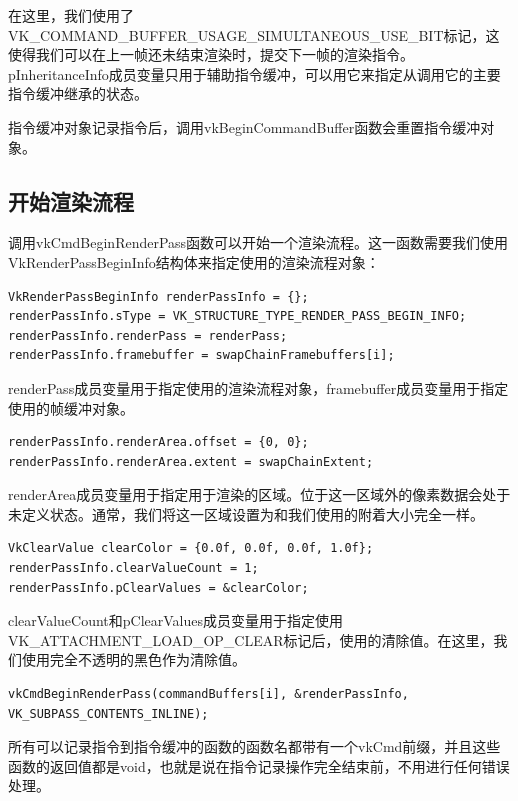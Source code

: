\documentclass{ctexart}
\begin{document}
在这里，我们使用了VK\_COMMAND\_BUFFER\_USAGE\_SIMULTANEOUS\_USE\_BIT标记，这使得我们可以在上一帧还未结束渲染时，提交下一帧的渲染指令。pInheritanceInfo成员变量只用于辅助指令缓冲，可以用它来指定从调用它的主要指令缓冲继承的状态。

指令缓冲对象记录指令后，调用vkBeginCommandBuffer函数会重置指令缓冲对象。

\subsection{开始渲染流程}

调用vkCmdBeginRenderPass函数可以开始一个渲染流程。这一函数需要我们使用VkRenderPassBeginInfo结构体来指定使用的渲染流程对象：

\begin{lstlisting}[language={[ANSI]C}]
VkRenderPassBeginInfo renderPassInfo = {};
renderPassInfo.sType = VK_STRUCTURE_TYPE_RENDER_PASS_BEGIN_INFO;
renderPassInfo.renderPass = renderPass;
renderPassInfo.framebuffer = swapChainFramebuffers[i];
\end{lstlisting}

renderPass成员变量用于指定使用的渲染流程对象，framebuffer成员变量用于指定使用的帧缓冲对象。

\begin{lstlisting}[language={[ANSI]C}]
renderPassInfo.renderArea.offset = {0, 0};
renderPassInfo.renderArea.extent = swapChainExtent;
\end{lstlisting}

renderArea成员变量用于指定用于渲染的区域。位于这一区域外的像素数据会处于未定义状态。通常，我们将这一区域设置为和我们使用的附着大小完全一样。

\begin{lstlisting}[language={[ANSI]C}]
VkClearValue clearColor = {0.0f, 0.0f, 0.0f, 1.0f};
renderPassInfo.clearValueCount = 1;
renderPassInfo.pClearValues = &clearColor;
\end{lstlisting}

clearValueCount和pClearValues成员变量用于指定使用VK\_ATTACHMENT\_LOAD\_OP\_CLEAR标记后，使用的清除值。在这里，我们使用完全不透明的黑色作为清除值。

\begin{lstlisting}[language={[ANSI]C}]
vkCmdBeginRenderPass(commandBuffers[i], &renderPassInfo, VK_SUBPASS_CONTENTS_INLINE);
\end{lstlisting}

所有可以记录指令到指令缓冲的函数的函数名都带有一个vkCmd前缀，并且这些函数的返回值都是void，也就是说在指令记录操作完全结束前，不用进行任何错误处理。
\end{document}
